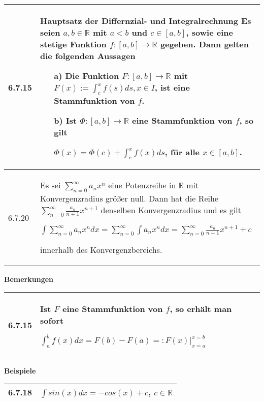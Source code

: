     \begin{longtable}{p{1cm} p{16cm}}
        \toprule

        6.7.15& \textbf{Hauptsatz der Differnzial- und Integralrechnung} \hfill \break
                Es seien $a,b \in \mathbb{R}$ mit $a < b$ und $c \in [a,b]$, sowie eine stetige Funktion $f: [a,b] \rightarrow \mathbb{R}$
                gegeben. Dann gelten die folgenden Aussagen 
                \begin{itemize}[topsep=-0.5cm]
                    \item[a)] Die Funktion $F: [a,b] \rightarrow \mathbb{R}$ mit $F(x) := \int_c^xf(s) ds, x\in I$, ist eine Stammfunktion
                                von $f$.
                    \item[b)] Ist $\Phi : [a,b] \rightarrow \mathbb{R}$ eine Stammfunktion von $f$, so gilt \hfill \break
                                \centerline{$ \Phi(x) = \Phi(c) + \int_c^x f(x) ds$, für alle $x\in[a,b]$.}
                \end{itemize} \vspace{-0cm} \\
        \midrule
        6.7.20& Es sei $\sum^{\infty}_{n=0} a_n x^n$ eine Potenzreihe in $\mathbb{R}$ mit Konvergenzradius größer null. Dann hat die Reihe
                $\sum^{\infty}_{n=0} \frac{a_n}{n+1}x^{n+1}$ denselben Konvergenzradius und es gilt \hfill \break
                \centerline{$ \int \sum^{\infty}_{n=0} a_n x^n dx = \sum^{\infty}_{n=0} \int a_n x^n dx = \sum^{\infty}_{n=0} 
                \frac{a_n}{n+1}x^{n+1}+c $} innerhalb des Konvergenzbereichs. \\

        \bottomrule
    \end{longtable}
    

    

    \noindent
    \textbf{Bemerkungen}
    
    \begin{longtable}{p{1cm} p{16cm}}
        \toprule

        6.7.15& Ist $F$ eine Stammfunktion von $f$, so erhält man sofort \hfill \break
                \centerline{$ \int_a^bf(x) dx = F(b)-F(a) =: F(x) \vert^{x=b}_{x=a} $} \\

        \bottomrule
    \end{longtable}
    

    \noindent
    \textbf{Beispiele}
    
    \begin{longtable}{p{1cm} p{16cm}}
        \toprule

        6.7.18& $\int sin(x) dx = -cos(x) + c$, $c \in \mathbb{R}$ \\

        \bottomrule
    \end{longtable}
    


